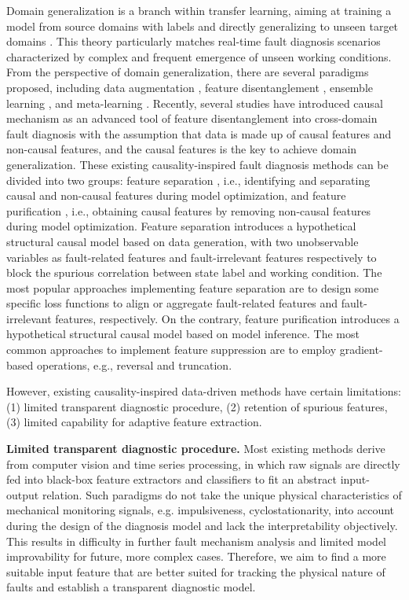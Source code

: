 \documentclass{article}
\begin{document}
	Domain generalization is a branch within transfer learning, aiming at training a model from source domains with labels and directly generalizing to unseen target domains \cite{RN3}. This theory particularly matches real-time fault diagnosis scenarios characterized by complex and frequent emergence of unseen working conditions. From the perspective of domain generalization, there are several paradigms proposed, including data augmentation \cite{RN34, RN35, RN36, RN37, RN38}, feature disentanglement \cite{ZHANG2025112460, 10930619}, ensemble learning \cite{RN10, RN42}, and meta-learning \cite{RN44, RN41}. Recently, several studies \cite{RN12, RN9, RN13, RN24, RN25, RN11, RN26, RN5, RN50} have introduced causal mechanism as an advanced tool of feature disentanglement into cross-domain fault diagnosis with the assumption that data is made up of causal features and non-causal features, and the causal features is the key to achieve domain generalization. These existing causality-inspired fault diagnosis methods can be divided into two groups: feature separation \cite{RN9, RN13, RN11, RN26, RN50, RN29, RN30, RN31}, i.e., identifying and separating causal and non-causal features during model optimization, and feature purification \cite{RN12, RN5}, i.e., obtaining causal features by removing non-causal features during model optimization. Feature separation introduces a hypothetical structural causal model based on data generation, with two unobservable variables as fault-related features and fault-irrelevant features respectively to block the spurious correlation between state label and working condition. The most popular approaches implementing feature separation are to design some specific loss functions to align or aggregate fault-related features and fault-irrelevant features, respectively. On the contrary, feature purification introduces a hypothetical structural causal model based on model inference. The most common approaches to implement feature suppression are to employ gradient-based operations, e.g., reversal and truncation.
	
	However, existing causality-inspired data-driven methods have certain limitations: (1) limited transparent diagnostic procedure, (2) retention of spurious features, (3) limited capability for adaptive feature extraction.
	
	\textbf{Limited transparent diagnostic procedure.} Most existing methods derive from computer vision and time series processing, in which raw signals are directly fed into black-box feature extractors and classifiers to fit an abstract input-output relation. Such paradigms do not take the unique physical characteristics of mechanical monitoring signals, e.g. impulsiveness, cyclostationarity, into account during the design of the diagnosis model and lack the interpretability objectively. This results in difficulty in further fault mechanism analysis and limited model improvability for future, more complex cases. Therefore, we aim to find a more suitable input feature that are better suited for tracking the physical nature of faults and establish a transparent diagnostic model.
	
\end{document}
